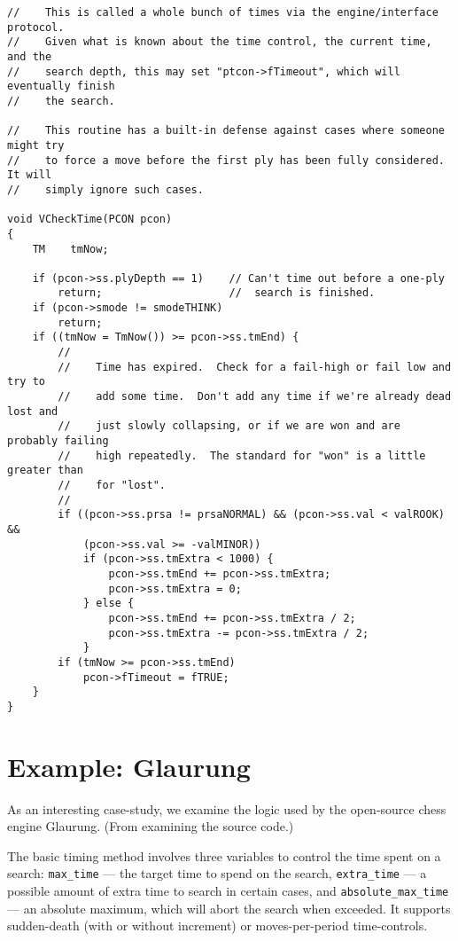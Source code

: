 \documentclass[10pt,dvipdfmx,letterpaper]{report}
\begin{document}
{\scriptsize
\begin{verbatim}
//    This is called a whole bunch of times via the engine/interface protocol.
//    Given what is known about the time control, the current time, and the
//    search depth, this may set "ptcon->fTimeout", which will eventually finish
//    the search.

//    This routine has a built-in defense against cases where someone might try
//    to force a move before the first ply has been fully considered.  It will
//    simply ignore such cases.

void VCheckTime(PCON pcon)
{
    TM    tmNow;

    if (pcon->ss.plyDepth == 1)    // Can't time out before a one-ply
        return;                    //  search is finished.
    if (pcon->smode != smodeTHINK)
        return;
    if ((tmNow = TmNow()) >= pcon->ss.tmEnd) {
        //
        //    Time has expired.  Check for a fail-high or fail low and try to
        //    add some time.  Don't add any time if we're already dead lost and
        //    just slowly collapsing, or if we are won and are probably failing
        //    high repeatedly.  The standard for "won" is a little greater than
        //    for "lost".
        //
        if ((pcon->ss.prsa != prsaNORMAL) && (pcon->ss.val < valROOK) &&
            (pcon->ss.val >= -valMINOR))
            if (pcon->ss.tmExtra < 1000) {
                pcon->ss.tmEnd += pcon->ss.tmExtra;
                pcon->ss.tmExtra = 0;
            } else {
                pcon->ss.tmEnd += pcon->ss.tmExtra / 2;
                pcon->ss.tmExtra -= pcon->ss.tmExtra / 2;
            }
        if (tmNow >= pcon->ss.tmEnd)
            pcon->fTimeout = fTRUE;
    }
}
\end{verbatim}
}


\section{Example: Glaurung}

As an interesting case-study, we examine the logic used by the open-source
chess engine Glaurung.  (From examining the source code.)

The basic timing method involves three variables to control the time
spent on a search:
\verb|max_time| --- the target time to spend on the search,
\verb|extra_time| --- a possible amount of extra time to search in certain
cases, and \verb|absolute_max_time| --- an absolute maximum, which will abort
the search when exceeded.
It supports sudden-death (with or without increment) or
moves-per-period time-controls.
\end{document}

